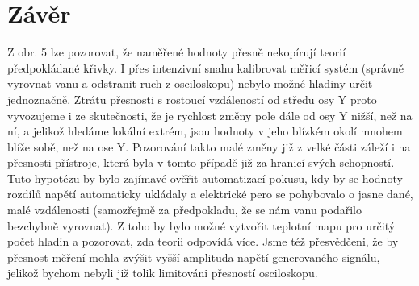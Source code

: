 \documentclass[czech,11pt,a4paper]{article}
\begin{document}
\begin{multicols}{2}
\begin{figure}[H]
\begin{center}
	\end{center}
\end{figure}

	\section{Závěr}
	Z obr. 5 lze pozorovat, že naměřené hodnoty přesně nekopírují teorií předpokládané křivky. I přes intenzivní snahu kalibrovat měřicí systém (správně vyrovnat vanu a odstranit ruch z osciloskopu) nebylo možné hladiny určit jednoznačně. Ztrátu přesnosti s rostoucí vzdáleností od středu osy Y proto vyvozujeme i ze skutečnosti, že je rychlost změny pole dále od osy Y nižší, než na ní, a jelikož hledáme lokální extrém, jsou hodnoty v jeho blízkém okolí mnohem blíže sobě, než na ose Y. Pozorování takto malé změny již z velké části záleží i na přesnosti přístroje, která byla v tomto případě již za hranicí svých schopností. Tuto hypotézu by bylo zajímavé ověřit automatizací pokusu, kdy by se hodnoty rozdílů napětí automaticky ukládaly a elektrické pero se pohybovalo o jasne dané, malé vzdálenosti (samozřejmě za předpokladu, že se nám vanu podařilo bezchybně vyrovnat). Z toho by bylo možné vytvořit teplotní mapu pro určitý počet hladin a pozorovat, zda teorii odpovídá více. Jsme též přesvědčeni, že by přesnost měření mohla zvýšit vyšší amplituda napětí generovaného signálu, jelikož bychom nebyli již tolik limitováni přesností osciloskopu. 
		\end{multicols}
	
\end{document}
